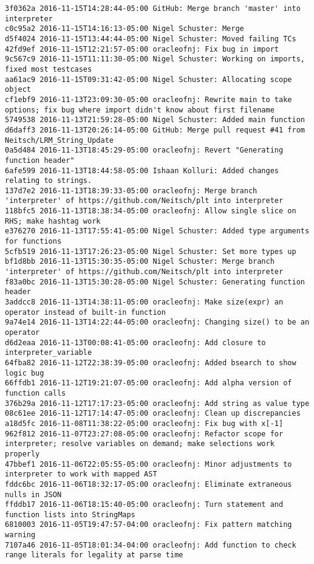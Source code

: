 \begin{lstlisting}
3f0362a 2016-11-15T14:28:44-05:00 GitHub: Merge branch 'master' into interpreter
c0c95a2 2016-11-15T14:16:13-05:00 Nigel Schuster: Merge
d5f4024 2016-11-15T13:44:44-05:00 Nigel Schuster: Moved failing TCs
42fd9ef 2016-11-15T12:21:57-05:00 oracleofnj: Fix bug in import
9c567c9 2016-11-15T11:11:30-05:00 Nigel Schuster: Working on imports, fixed most testcases
aa61ac9 2016-11-15T09:31:42-05:00 Nigel Schuster: Allocating scope object
cf1ebf9 2016-11-13T23:09:30-05:00 oracleofnj: Rewrite main to take options; fix bug where import didn't know about first filename
5749538 2016-11-13T21:59:28-05:00 Nigel Schuster: Added main function
d6daff3 2016-11-13T20:26:14-05:00 GitHub: Merge pull request #41 from Neitsch/LRM_String_Update
0a5d484 2016-11-13T18:45:29-05:00 oracleofnj: Revert "Generating function header"
6afe599 2016-11-13T18:44:58-05:00 Ishaan Kolluri: Added changes relating to strings.
137d7e2 2016-11-13T18:39:33-05:00 oracleofnj: Merge branch 'interpreter' of https://github.com/Neitsch/plt into interpreter
118bfc5 2016-11-13T18:38:34-05:00 oracleofnj: Allow single slice on RHS; make hashtag work
e376270 2016-11-13T17:55:41-05:00 Nigel Schuster: Added type arguments for functions
5cfb519 2016-11-13T17:26:23-05:00 Nigel Schuster: Set more types up
bf1d8bb 2016-11-13T15:30:35-05:00 Nigel Schuster: Merge branch 'interpreter' of https://github.com/Neitsch/plt into interpreter
f83a0bc 2016-11-13T15:30:28-05:00 Nigel Schuster: Generating function header
3addcc8 2016-11-13T14:38:11-05:00 oracleofnj: Make size(expr) an operator instead of built-in function
9a74e14 2016-11-13T14:22:44-05:00 oracleofnj: Changing size() to be an operator
d6d2eaa 2016-11-13T00:08:41-05:00 oracleofnj: Add closure to interpreter_variable
64fba82 2016-11-12T22:38:39-05:00 oracleofnj: Added bsearch to show logic bug
66ffdb1 2016-11-12T19:21:07-05:00 oracleofnj: Add alpha version of function calls
376b29a 2016-11-12T17:17:23-05:00 oracleofnj: Add string as value type
08c61ee 2016-11-12T17:14:47-05:00 oracleofnj: Clean up discrepancies
a18d5fc 2016-11-08T11:38:22-05:00 oracleofnj: Fix bug with x[-1]
962f812 2016-11-07T23:27:08-05:00 oracleofnj: Refactor scope for interpreter; resolve variables on demand; make selections work properly
47bbef1 2016-11-06T22:05:55-05:00 oracleofnj: Minor adjustments to interpreter to work with mapped AST
fddc6bc 2016-11-06T18:32:17-05:00 oracleofnj: Eliminate extraneous nulls in JSON
ffddb17 2016-11-06T18:15:40-05:00 oracleofnj: Turn statement and function lists into StringMaps
6810003 2016-11-05T19:47:57-04:00 oracleofnj: Fix pattern matching warning
7107a46 2016-11-05T18:01:34-04:00 oracleofnj: Add function to check range literals for legality at parse time

\end{lstlisting}
